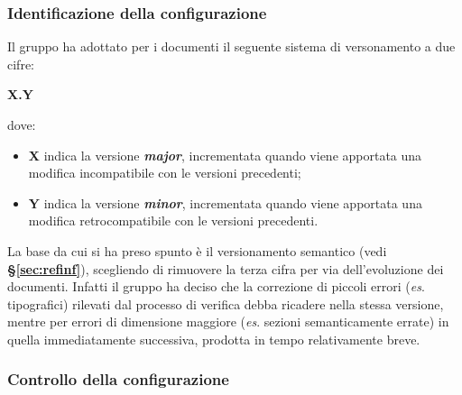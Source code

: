 \documentclass[a4paper,12pt]{article}
\begin{document}
        \subsubsection{Identificazione della configurazione}
            \label{sec:idconf}
            Il gruppo ha adottato per i documenti il seguente sistema di versonamento a due cifre:
            \begin{center}
                \textbf{X.Y}
            \end{center}    
            dove:
            \begin{itemize}
                \item \textbf{X} indica la versione \textbf{\textit{major}}, incrementata quando viene apportata una modifica incompatibile con le versioni precedenti;
                \item \textbf{Y} indica la versione \textbf{\textit{minor}}, incrementata quando viene apportata una modifica retrocompatibile con le versioni precedenti.
            \end{itemize}
            La base da cui si ha preso spunto è il versionamento semantico (vedi \textbf{\S\ref{sec:refinf}}), scegliendo di rimuovere la terza cifra per via dell'evoluzione dei documenti.
            Infatti il gruppo ha deciso che la correzione di piccoli errori (\textit{es}. tipografici) rilevati dal processo di verifica debba ricadere nella stessa versione, mentre per errori di dimensione maggiore (\textit{es}. sezioni semanticamente errate) in quella immediatamente successiva, prodotta in tempo relativamente breve.

        \subsubsection{Controllo della configurazione}
\end{document}
